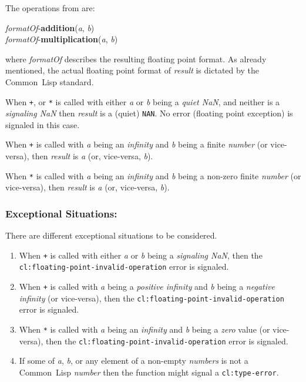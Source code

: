 \documentclass[10pt,fleqn]{article}
\newcommand{\CL}{\textsf{Common~Lisp}}
\newcommand{\code}[1]{\texttt{#1}}
\newcommand{\clieeeterm}[1]{\textit{#1}}
\newcommand{\varname}[1]{\textit{#1}}
\newcommand{\clterm}[1]{\textit{#1}}
\newcommand{\clname}[1]{\texttt{#1}}
\newcommand{\DExceptional}{\subsubsection*{Exceptional Situations:}}
\begin{document}
\noindent
The operations from \cite{2008:IEEE-754} are:

\vspace*{3mm}

\noindent
\textit{formatOf}-\textbf{addition}(\varname{a}, \varname{b})\\
\textit{formatOf}-\textbf{multiplication}(\varname{a}, \varname{b})

\vspace*{3mm}

\noindent
where \textit{formatOf} describes the resulting floating point
format.  As already mentioned, the actual floating point format of
\varname{result} is dictated by the \CL{} standard.

When \code{+}, or \code{*} is called with either \varname{a} or
\varname{b} being a \emph{quiet NaN}, and neither is a
\emph{signaling NaN} then \varname{result} is a (quiet) \code{NAN}.
No error (floating point exception) is signaled in this case.

When \code{+} is called with \varname{a} being an 
\clieeeterm{infinity} and \varname{b} being a finite \clterm{number}
(or vice-versa), then \varname{result} is \varname{a} (or, vice-versa, 
\varname{b}).

When \code{*} is called with \varname{a} being an
\clieeeterm{infinity} and \varname{b} being a non-zero finite
\clterm{number} (or vice-versa), then \varname{result} is \varname{a}
(or, vice-versa, \varname{b}).

\DExceptional{}

There are different exceptional situations to be considered.

\begin{enumerate}
\item When \code{+} is called with either \varname{a} or \varname{b}
  being a \emph{signaling NaN}, then the\\
  \clname{cl:floating-point-invalid-operation} error is signaled.

\item When \code{+} is called with \varname{a} being a
  \clieeeterm{positive infinity} and \varname{b} being a
  \clieeeterm{negative infinity} (or vice-versa), then the
  \clname{cl:floating-point-invalid-operation} error is signaled.

\item When \code{*} is called with \varname{a} being an
  \clieeeterm{infinity} and \varname{b} being a \clieeeterm{zero}
  value (or vice-versa), then the
  \clname{cl:floating-point-invalid-operation} error is signaled.

\item If some of \varname{a}, \varname{b}, or any element of a non-empty
  \varname{numbers} is not a \CL{} \clterm{number} then the function
  might signal a \clname{cl:type-error}.
\end{enumerate}
\end{document}
